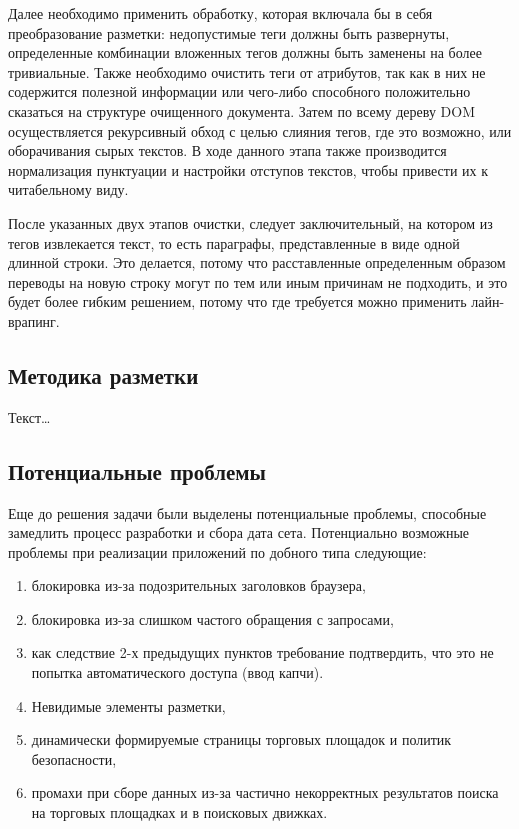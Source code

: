\documentclass[../main]{subfiles}
\begin{document}
Далее необходимо применить обработку, которая включала бы в себя преобразование разметки: недопустимые теги должны быть развернуты, определенные комбинации вложенных тегов должны быть заменены на более тривиальные. Также необходимо очистить теги от атрибутов, так как в них не содержится полезной информации или чего-либо способного положительно сказаться на структуре очищенного документа. Затем по всему дереву DOM осуществляется рекурсивный обход с целью слияния тегов, где это возможно, или оборачивания сырых текстов. В ходе данного этапа также производится нормализация пунктуации и настройки отступов текстов, чтобы привести их к читабельному виду. 

После указанных двух этапов очистки, следует заключительный, на котором из тегов извлекается текст, то есть параграфы, представленные в виде одной длинной строки. Это делается, потому что расставленные определенным образом переводы на новую строку могут по тем или иным причинам не подходить, и это будет более гибким решением, потому что где требуется можно применить лайн-врапинг.

\subsection{Методика разметки}
Текст\dots

\subsection{Потенциальные проблемы}
Еще до решения задачи были выделены потенциальные проблемы, способные замедлить процесс разработки и сбора дата сета. Потенциально возможные проблемы при реализации приложений по добного типа следующие:
\begin{enumerate}
    \item блокировка из-за подозрительных заголовков браузера,
    \item блокировка из-за слишком частого обращения с запросами,
    \item как следствие 2-х предыдущих пунктов требование подтвердить, что это не попытка автоматического доступа (ввод капчи).
    \item Невидимые элементы разметки,
    \item динамически формируемые страницы торговых площадок и политик безопасности,
    \item промахи при сборе данных из-за частично некорректных результатов поиска на торговых площадках и в поисковых движках.
\end{enumerate}
\end{document}
